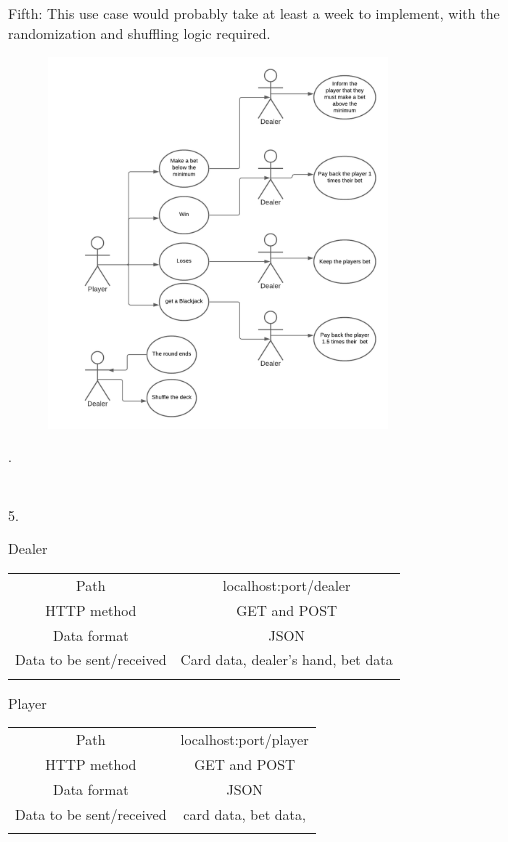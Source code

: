 \documentclass[12pt, a4paper]{article}
\begin{document}
Fifth: This use case would probably take at least a week to implement, with the randomization and shuffling logic required.
\begin{figure}[ht!]
\centering
\includegraphics[width=90mm]{useCase.png}
\end{figure}.\\ \\ \\

5.\\

\begin{center}
Dealer
\begin{tabular}{ c || c  }
 Path & localhost:port/dealer  \\ 
 HTTP method &  GET and POST \\  
 Data format &  JSON    \\ 
Data to be sent/received & Card data, dealer's hand, bet data  \\ \\
\end{tabular}
\end{center}

\begin{center}
Player
\begin{tabular}{ c || c  }
 Path & localhost:port/player  \\ 
 HTTP method &  GET and POST \\  
 Data format &  JSON    \\
Data to be sent/received & card data, bet data,  \\ \\
\end{tabular}
\end{center}
\end{document}
